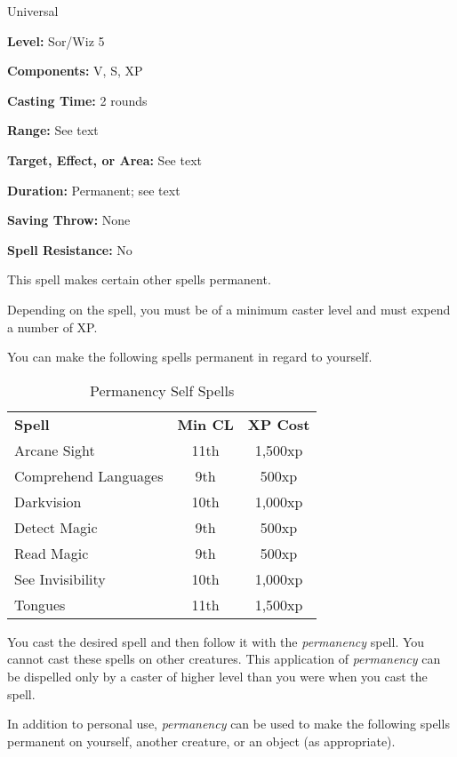 
Universal

\textbf{Level:} Sor/Wiz 5

\textbf{Components:} V, S, XP

\textbf{Casting Time:} 2 rounds

\textbf{Range:} See text

\textbf{Target, Effect, or Area:} See text

\textbf{Duration:} Permanent; see text

\textbf{Saving Throw:} None

\textbf{Spell Resistance:} No

This spell makes certain other spells permanent.

Depending on the spell, you must be of a minimum caster level and must expend a 
number of XP.

You can make the following spells permanent in regard to yourself.

\begin{table}[htb]
\caption{Permanency Self Spells}
\centering
\begin{tabular}{l c c}
\textbf{Spell} & \textbf{Min CL} & \textbf{XP Cost}\\
Arcane Sight & 11th & 1,500xp\\
Comprehend Languages & 9th & 500xp\\
Darkvision & 10th & 1,000xp\\
Detect Magic & 9th & 500xp\\
Read Magic & 9th & 500xp\\
See Invisibility & 10th & 1,000xp\\
Tongues & 11th & 1,500xp\\
\end{tabular}
\end{table}

You cast the desired spell and then follow it with the \textit{permanency} spell. 
You cannot cast these spells on other creatures. This application of \textit{permanency 
}can be dispelled only by a caster of higher level than you were when you cast 
the spell.

In addition to personal use, \textit{permanency} can be used to make the following 
spells permanent on yourself, another creature, or an object (as appropriate).

